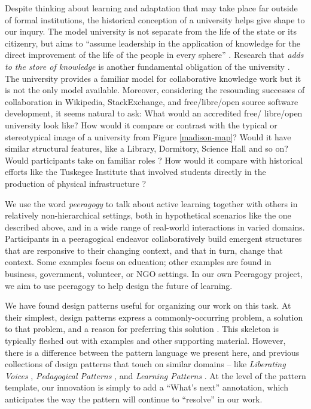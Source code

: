 Despite thinking about learning and adaptation that
may take place far outside of formal institutions, the historical
conception of a university helps give shape to our inqury.
%
The model university is not separate from the life of the state or its
citizenry, but aims to ``assume leadership in the application of
knowledge for the direct improvement of the life of the people in
every sphere'' \cite[p.~88]{curti1949university}. Research that
\emph{adds to the store of knowledge} is another fundamental
obligation of the university \cite[p.~550]{curti1949university}.
The university provides a familiar model for collaborative knowledge work
but it is not the only model available.
Moreover, considering the resounding successes of collaboration in Wikipedia,
StackExchange, and free\slash libre\slash open source software
development, it seems natural to ask: What would an accredited free\slash
libre\slash open university look like?  How would it compare or
contrast with the typical or stereotypical image of a university from
Figure \ref{madison-map}?  Would it have similar structural features, like a Library,
Dormitory, Science Hall and so on?  Would participants take
on familiar roles \cite{corneli+crowdsourcing}?  How would it compare
with historical efforts like the Tuskegee Institute that involved
students directly in the production of physical infrastructure
\cite{washington1986up,building-peeragogy-accelerator}?

We use the word \emph{peeragogy} to talk about active learning
together with others in relatively non-hierarchical settings, both in
hypothetical scenarios like the one described above, and in a wide
range of real-world interactions in varied domains.  Participants in a
peeragogical endeavor collaboratively build emergent structures that
are responsive to their changing context, and that in turn, change that
context.  Some examples focus on education; other examples are found
in business, government, volunteer, or NGO settings.  In our own
Peeragogy project, we aim to use peeragogy to help design the future of
learning.

We have found design patterns useful for organizing our work on this task.  
At their simplest, design patterns express a commonly-occurring problem,
a solution to that problem, and a reason for preferring this solution \cite{meszaros1998pattern}.
This skeleton is typically fleshed out with examples and other supporting material.
However, there is a difference between the pattern language we present here, and previous collections of design patterns that touch on similar domains -- like \emph{Liberating Voices} \cite{schuler2008liberating}, \emph{Pedagogical Patterns} \cite{bergin2012pedagogical},
and \emph{Learning Patterns} \cite{iba2014learning}.  At the level of the pattern template, our innovation is simply to add a ``What's next'' annotation, which anticipates the way the pattern will continue to ``resolve'' in our work.

